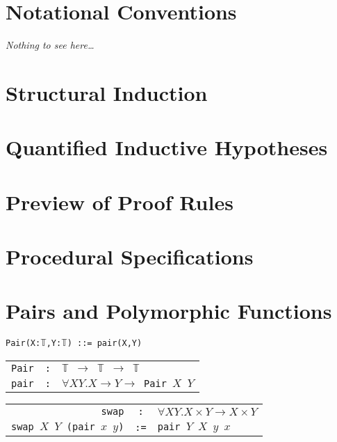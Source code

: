 \documentclass[12pt]{report}
\begin{document}
\section{Notational Conventions}

\emph{Nothing to see here\ldots}

\section{Structural Induction}

\section{Quantified Inductive Hypotheses}

\section{Preview of Proof Rules}

\section{Procedural Specifications}

\section{Pairs and Polymorphic Functions}

\begin{description}[leftmargin=2.5cm, style=nextline]
  \item[\gls{pairs_definition}] \texttt{Pair(X:$\mathbb{T}$,Y:$\mathbb{T}$) ::= pair(X,Y)}
  \item[\gls{pairs_constructors}]
  \begin{tabular}{rcl}
    \texttt{Pair}&\texttt{:}&\texttt{$\mathbb{T}$ $\rightarrow$ $\mathbb{T}$ $\rightarrow$ $\mathbb{T}$}\\
    \texttt{pair}&\texttt{:}&$\forall X Y. X \rightarrow Y \rightarrow$\texttt { Pair $X$ $Y$}
  \end{tabular}
  \item[\gls{pairs_swap}]
  \begin{tabular}{rcl}
    \texttt{swap}&\texttt{:}&$\forall X Y. X \times Y \rightarrow X \times Y$\\
    \texttt{swap $X$ $Y$ (pair $x$ $y$)}&\texttt{:=}&\texttt{pair $Y$ $X$ $y$ $x$}
  \end{tabular}
\end{description}
\end{document}
